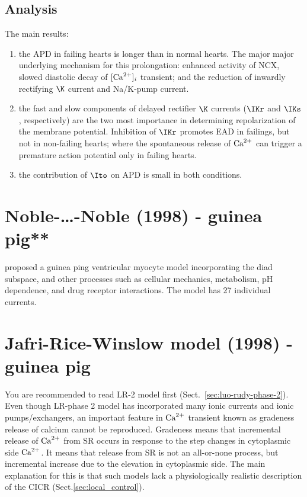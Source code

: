 \subsection{Analysis}

The main results:
\begin{enumerate}
  \item the APD in failing hearts is longer than in normal hearts. The major
  major underlying mechanism for this prolongation: enhanced activity of NCX,
  slowed diastolic decay of $[{\text{Ca}^{2+}}]_i$ transient; and the reduction of inwardly
  rectifying $\K$ current and Na/K-pump current.
  \item the fast and slow components of delayed rectifier $\K$ currents ($\IKr$
  and $\IKs$, respectively) are the two most importance in determining
  repolarization of the membrane potential. Inhibition of $\IKr$ promotes EAD in
  failings, but not in non-failing hearts; where the spontaneous release of
  ${\text{Ca}^{2+}}$ can trigger a premature action potential only in failing hearts.
  \item the contribution of $\Ito$ on APD is small in both conditions.
\end{enumerate}



\section{Noble-\ldots-Noble (1998) - guinea pig**}

\citep{noble1998} proposed a guinea ping ventricular myocyte model incorporating
the diad subspace, and other processes such as cellular mechanics, metabolism,
pH dependence, and drug receptor interactions. The model has 27 individual
currents.


\section{Jafri-Rice-Winslow model (1998) - guinea pig}
\label{sec:jafri-rice-winslow}

You are recommended to read LR-2 model first (Sect.~\ref{sec:luo-rudy-phase-2}).
Even though LR-phase 2 model has incorporated many ionic currents and ionic
pumps/exchangers, an important feature in ${\text{Ca}^{2+}}$ transient known as gradeness
release of calcium cannot be reproduced. Gradeness means that incremental
release of ${\text{Ca}^{2+}}$ from SR occurs in response to the step changes in cytoplasmic
side ${\text{Ca}^{2+}}$. It means that  release from SR is not an all-or-none
process, but incremental increase due to the  elevation in cytoplasmic 
side. The main explanation for this is that such models lack a
physiologically realistic description of the CICR
(Sect.\ref{sec:local_control}).

